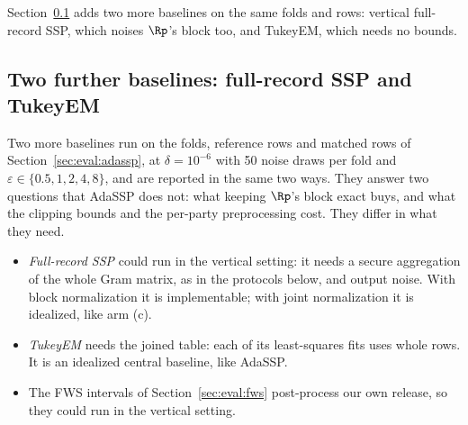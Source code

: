 

Section~\ref{sec:eval:baselines} adds two more baselines on the same folds and rows: vertical full-record SSP, which noises $\Rp$'s block too, and TukeyEM, which needs no bounds.

\subsection{Two further baselines: full-record SSP and TukeyEM}
\label{sec:eval:baselines}

Two more baselines run on the folds, reference rows and matched rows of Section~\ref{sec:eval:adassp}, at $\delta = 10^{-6}$ with 50 noise draws per fold and $\varepsilon \in \{0.5, 1, 2, 4, 8\}$, and are reported in the same two ways. They answer two questions that AdaSSP does not: what keeping $\Rp$'s block exact buys, and what the clipping bounds and the per-party preprocessing cost. They differ in what they need.
\begin{itemize}[noitemsep]
  \item \emph{Full-record SSP} could run in the vertical setting: it needs a secure aggregation of the whole Gram matrix, as in the protocols below, and output noise. With block normalization it is implementable; with joint normalization it is idealized, like arm (c).
  \item \emph{TukeyEM} needs the joined table: each of its least-squares fits uses whole rows. It is an idealized central baseline, like AdaSSP.
  \item The FWS intervals of Section~\ref{sec:eval:fws} post-process our own release, so they could run in the vertical setting.
\end{itemize}

